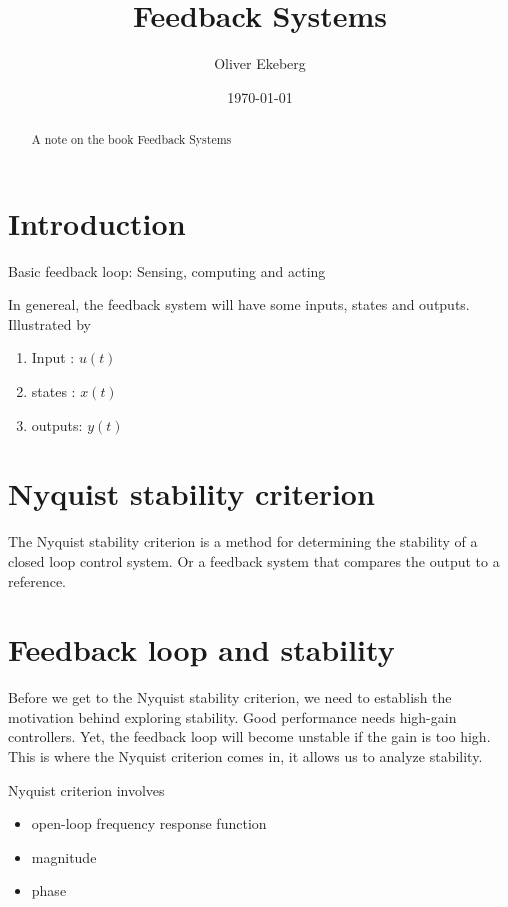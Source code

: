 \documentclass[11pt, a4paper]{article} %
\title{Feedback Systems}
\author{Oliver Ekeberg}
\date{\today} %
\begin{document}
\maketitle

\tableofcontents

\begin{abstract}
    A note on the book Feedback Systems
\end{abstract}

\section{Introduction}
\label{sec:introduction}

Basic feedback loop: Sensing, computing and acting

In genereal, the feedback system will have some inputs, states and outputs. Illustrated by

\begin{enumerate}
    \item Input : $u(t) $
    \item states : $x(t)$
    \item outputs: $y(t)$
\end{enumerate}


\section{Nyquist stability criterion}


The Nyquist stability criterion is a method for determining the stability of a closed loop control system. Or a feedback system that compares the output to a reference.



\section{Feedback loop and stability}

Before we get to the Nyquist stability criterion, we need to establish the motivation behind exploring stability. Good performance needs high-gain controllers. Yet, the feedback loop will become unstable if the gain is too high. This is where the Nyquist criterion comes in, it allows us to analyze stability. 

Nyquist criterion involves 


\begin{itemize}
    \item open-loop frequency response function
    \item magnitude
    \item phase
\end{itemize}
\end{document}
